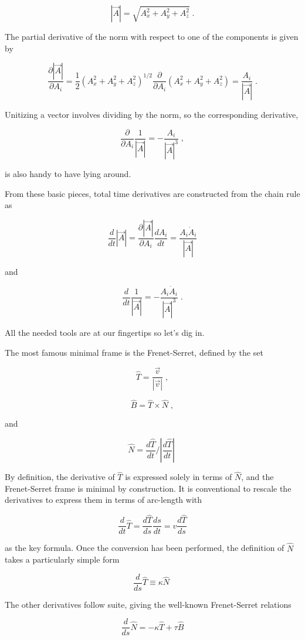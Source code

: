 \documentclass[10pt]{article}
\begin{document}
\[ |\vec A | = \sqrt{ A_x^2 + A_y^2 + A_z^2 } \; .\]

The partial derivative of the norm with respect to one of the components is given by

\[ \frac{\partial |\vec A|}{\partial A_i} = \frac{1}{2} \left( A_x^2 + A_y^2 + A_z^2 \right)^{1/2} \frac{\partial}{\partial A_i} \left( A_x^2 + A_y^2 + A_z^2 \right) = \frac{A_i}{|\vec A|} \; .\]

Unitizing a vector involves dividing by the norm, so the corresponding derivative,
 
\[ \frac{\partial}{\partial A_i} \frac{1}{|\vec A|} = -\frac{A_i}{|\vec A|^3} \; ,\]

is also handy to have lying around. 

From these basic pieces, total time derivatives are constructed from the chain rule as

\[ \frac{d}{dt} |\vec A| = \frac{\partial |\vec A|}{\partial A_i} \frac{d A_i}{dt} = \frac{A_i {\dot A}_i}{|\vec A|} \]

and

\[ \frac{d}{dt} \frac{1}{|\vec A|} = - \frac{A_i {\dot A}_i}{|\vec A|^3} \; .\]

All the needed tools are at our fingertips so let's dig in.

The most famous minimal frame is the Frenet-Serret, defined by the set

\[ \hat T = \frac{\vec v}{|\vec v|} \; ,\]

\[ \hat B = \hat T \times \hat N \; ,\]

and

\[ \hat N = \frac{d \hat T}{d t} / \left| \frac{d \hat T}{d t} \right | \; \]

By definition, the derivative of $\hat T$ is expressed solely in terms of $\hat N$, and the Frenet-Serret frame is minimal by construction.  It is conventional to rescale the derivatives to express them in terms of arc-length with

\[ \frac{d}{dt} \hat T = \frac{d \hat T}{d s}  \frac{ds}{dt} = v \frac{d \hat T}{d s}  \]

as the key formula.  Once the conversion has been performed, the definition of $\hat N$ takes a particularly simple form

\[ \frac{d}{d s} \hat T \equiv \kappa \hat N \;\]
 
The other derivatives follow suite, giving the well-known Frenet-Serret relations

\[ \frac{d}{d s} \hat N = - \kappa \hat T + \tau \hat B \]
\end{document}
